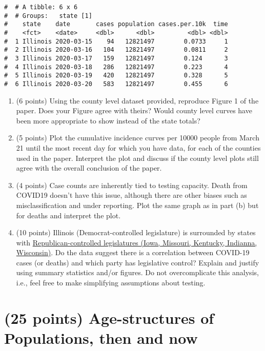 \documentclass[letterpaper,12pt,twoside,]{pinp}
\providecommand{\tightlist}{%
  \setlength{\itemsep}{0pt}\setlength{\parskip}{0pt}}
\begin{document}
\begin{ShadedResult}
\begin{verbatim}
#  # A tibble: 6 x 6
#  # Groups:   state [1]
#    state    date       cases population cases.per.10k  time
#    <fct>    <date>     <dbl>      <dbl>         <dbl> <dbl>
#  1 Illinois 2020-03-15    94   12821497        0.0733     1
#  2 Illinois 2020-03-16   104   12821497        0.0811     2
#  3 Illinois 2020-03-17   159   12821497        0.124      3
#  4 Illinois 2020-03-18   286   12821497        0.223      4
#  5 Illinois 2020-03-19   420   12821497        0.328      5
#  6 Illinois 2020-03-20   583   12821497        0.455      6
\end{verbatim}
\end{ShadedResult}

\begin{enumerate}
\def\labelenumi{\alph{enumi})}
\tightlist
\item
  (6 points) Using the county level dataset provided, reproduce Figure 1
  of the paper. Does your Figure agree with theirs? Would county level
  curves have been more appropriate to show instead of the state totals?
\item
  (5 points) Plot the cumulative incidence curves per 10000 people from
  March 21 until the most recent day for which you have data, for each
  of the counties used in the paper. Interpret the plot and discuss if
  the county level plots still agree with the overall conclusion of the
  paper.
\item
  (4 points) Case counts are inherently tied to testing capacity. Death
  from COVID19 doesn't have this issue, although there are other biases
  such as misclassification and under reporting. Plot the same graph as
  in part (b) but for deaths and interpret the plot.
\item
  (10 points) Illinois (Democrat-controlled legislature) is surrounded
  by states with
  \href{https://www.ncsl.org/research/about-state-legislatures/partisan-composition.aspx\#}{Republican-controlled
  legislatures (Iowa, Missouri, Kentucky, Indianna, Wisconsin)}. Do the
  data suggest there is a correlation between COVID-19 cases (or deaths)
  and which party has legislative control? Explain and justify using
  summary statistics and/or figures. Do not overcomplicate this
  analysis, i.e., feel free to make simplifying assumptions about
  testing.
\end{enumerate}

\newpage

\hypertarget{points-age-structures-of-populations-then-and-now}{%
\section{(25 points) Age-structures of Populations, then and
now}\label{points-age-structures-of-populations-then-and-now}}
\end{document}
